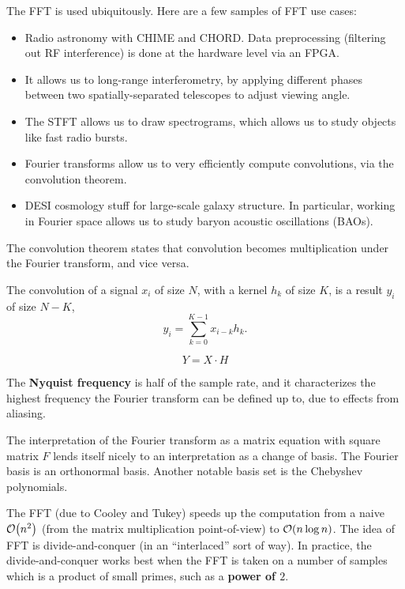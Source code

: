 \documentclass[12pt,letterpaper]{article}
\begin{document}
The FFT is used ubiquitously. Here are a few samples of FFT use cases:
\begin{itemize}
    \item Radio astronomy with CHIME and CHORD. Data preprocessing (filtering out RF interference) is done at the hardware level via an FPGA.
    \item It allows us to long-range interferometry, by applying different phases between two spatially-separated telescopes to adjust viewing angle.
    \item The STFT allows us to draw spectrograms, which allows us to study objects like fast radio bursts.
    \item Fourier transforms allow us to very efficiently compute convolutions, via the convolution theorem.
    \item DESI cosmology stuff for large-scale galaxy structure. In particular, working in Fourier space allows us to study baryon acoustic oscillations (BAOs).
\end{itemize}
The convolution theorem states that convolution becomes multiplication under the Fourier transform, and vice versa.
\begin{definition}
    The convolution of a signal $x_i$ of size $N$, with a kernel $h_k$ of size $K$, is a result $y_i$ of size $N-K$,
    \[y_i=\sum_{k=0}^{K-1}x_{i-k}h_k.\]
\end{definition}
\begin{theorem}
    \[Y=X\cdot H\]
\end{theorem}
\begin{definition}
    The \textbf{Nyquist frequency} is half of the sample rate, and it characterizes the highest frequency the Fourier transform can be defined up to, due to effects from aliasing.
\end{definition}
The interpretation of the Fourier transform as a matrix equation with square matrix $F$ lends itself nicely to an interpretation as a change of basis. The Fourier basis is an orthonormal basis. Another notable basis set is the Chebyshev polynomials.

The FFT (due to Cooley and Tukey) speeds up the computation from a naive $\order{n^2}$ (from the matrix multiplication point-of-view) to $\order{n\log{n}}$. The idea of FFT is divide-and-conquer (in an ``interlaced'' sort of way). In practice, the divide-and-conquer works best when the FFT is taken on a number of samples which is a product of small primes, such as a \textbf{power of $2$}.
\end{document}
